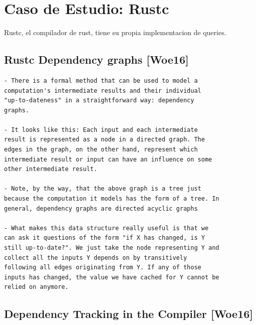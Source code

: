 \chapter*{Caso de Estudio: Rustc}

Rustc, el compilador de rust, tiene su propia implementacion de queries.

\section*{Rustc Dependency graphs [Woe16]}

\begin{verbatim}
- There is a formal method that can be used to model a
computation's intermediate results and their individual
"up-to-dateness" in a straightforward way: dependency
graphs.

- It looks like this: Each input and each intermediate
result is represented as a node in a directed graph. The
edges in the graph, on the other hand, represent which
intermediate result or input can have an influence on some
other intermediate result.

- Note, by the way, that the above graph is a tree just
because the computation it models has the form of a tree. In
general, dependency graphs are directed acyclic graphs

- What makes this data structure really useful is that we
can ask it questions of the form "if X has changed, is Y
still up-to-date?". We just take the node representing Y and
collect all the inputs Y depends on by transitively
following all edges originating from Y. If any of those
inputs has changed, the value we have cached for Y cannot be
relied on anymore.
\end{verbatim}
\cite{rust_blog_incremental_compilation}

\section*{Dependency Tracking in the Compiler [Woe16]}


